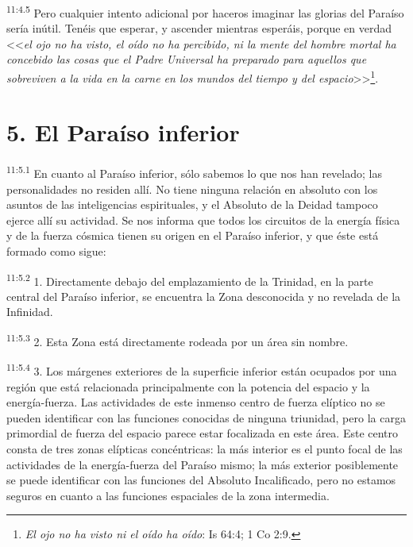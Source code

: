 \par
\textsuperscript{11:4.5} Pero cualquier intento adicional por haceros imaginar las glorias del Paraíso sería inútil. Tenéis que esperar, y ascender mientras esperáis, porque en verdad <<\textit{el ojo no ha visto, el oído no ha percibido, ni la mente del hombre mortal ha concebido las cosas que el Padre Universal ha preparado para aquellos que sobreviven a la vida en la carne en los mundos del tiempo y del espacio}>>\footnote{\textit{El ojo no ha visto ni el oído ha oído}: Is 64:4; 1 Co 2:9.}.

\section*{5. El Paraíso inferior}
\par
\textsuperscript{11:5.1} En cuanto al Paraíso inferior, sólo sabemos lo que nos han revelado; las personalidades no residen allí. No tiene ninguna relación en absoluto con los asuntos de las inteligencias espirituales, y el Absoluto de la Deidad tampoco ejerce allí su actividad. Se nos informa que todos los circuitos de la energía física y de la fuerza cósmica tienen su origen en el Paraíso inferior, y que éste está formado como sigue:

\par
\textsuperscript{11:5.2} 1. Directamente debajo del emplazamiento de la Trinidad, en la parte central del Paraíso inferior, se encuentra la Zona desconocida y no revelada de la Infinidad.

\par
\textsuperscript{11:5.3} 2. Esta Zona está directamente rodeada por un área sin nombre.

\par
\textsuperscript{11:5.4} 3. Los márgenes exteriores de la superficie inferior están ocupados por una región que está relacionada principalmente con la potencia del espacio y la energía-fuerza. Las actividades de este inmenso centro de fuerza elíptico no se pueden identificar con las funciones conocidas de ninguna triunidad, pero la carga primordial de fuerza del espacio parece estar focalizada en este área. Este centro consta de tres zonas elípticas concéntricas: la más interior es el punto focal de las actividades de la energía-fuerza del Paraíso mismo; la más exterior posiblemente se puede identificar con las funciones del Absoluto Incalificado, pero no estamos seguros en cuanto a las funciones espaciales de la zona intermedia.

